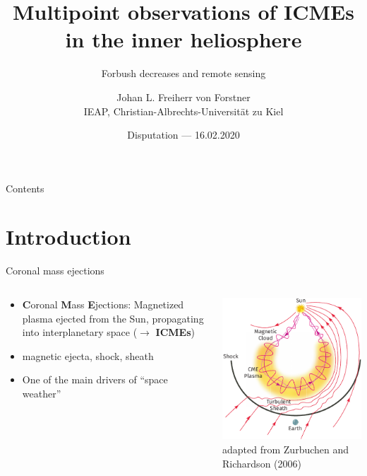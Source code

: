 \documentclass[10pt,aspectratio=169,usenames,dvipsnames]{beamer}
\title{Multipoint observations of ICMEs\\in the inner heliosphere}
\subtitle{Forbush decreases and remote sensing}
\author{Johan L. Freiherr von Forstner\\IEAP, Christian-Albrechts-Universität zu Kiel}
\date{Disputation --- 16.02.2020}
\begin{document}
\maketitle

\begin{frame}{Contents}
    \tableofcontents
\end{frame}

\section{Introduction}

\begin{frame}{Coronal mass ejections}
    \begin{columns}
        \begin{column}{0.54\textwidth}
            \begin{itemize}
                \item \textbf{C}oronal \textbf{M}ass \textbf{E}jections: Magnetized plasma ejected from the Sun, propagating into interplanetary space ($\rightarrow$ \textbf{ICMEs})
                \item magnetic ejecta, shock, sheath
                \item One of the main drivers of ``space weather''
            \end{itemize}
        \end{column}
        \begin{column}{0.36\textwidth}
        	\centering
            \includegraphics[width=\textwidth]{images/ZurbuchenRichardson-adapted.pdf}\\
            \scriptsize adapted from Zurbuchen and Richardson (2006)
        \end{column}
    \end{columns}
\end{frame}
\end{document}
